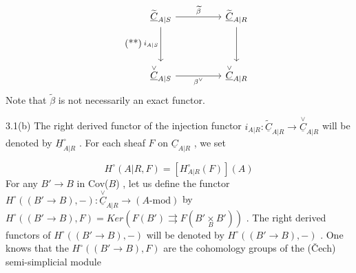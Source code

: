 \begin{equation}\tag{**}
\begin{tikzcd}[column sep=huge, row sep=huge]
\widetilde{\underline{C}}_{A|S} \arrow[r, "\widetilde{\beta}"] \arrow[d, "i_{A|S}"'] & \widetilde{\underline{C}}_{A|R} \arrow[d] \\
\overset{\vee}{\underline{C}}_{A|S} \arrow[r, "\beta^{\vee}"'] & \overset{\vee}{\underline{C}}_{A|R}
\end{tikzcd}
\end{equation}
Note that  $\widetilde{\beta}$  is not necessarily an exact functor.

3.1(b)  The right derived functor of the injection functor  $i_{A|R}: \widetilde{\underline{C}}_{A|R} \to \overset{\vee}{\underline{C}}_{A|R}$  will be denoted by  $\underline{H}^{\circ}_{A|R}$ . For each sheaf  $F$  on  $\underline{C}_{A|R}$ , we set

\begin{equation*}
H^{\circ}(A|R,F) = [H^{\circ}_{A|R}(F)](A)
\end{equation*}
For any  $B' \to B$  in  Cov($B$) , let us define the functor  $H^{\circ}((B' \to B),-) : \overset{\vee}{\underline{C}}_{A|R} \to (A\text{-mod})$  by  $H^{\circ}((B'\to B),F) = Ker(F(B') \rightrightarrows F(B'\underset{B}{\times} B'))$ . The right derived functors of  $H^{\circ}((B' \to B),-)$  will be denoted by  $H^{\circ}((B'\to B),-)$ . One knows that the  $H^{\circ}((B' \to B),F)$  are the cohomology groups of the (Čech)
semi-simplicial module

